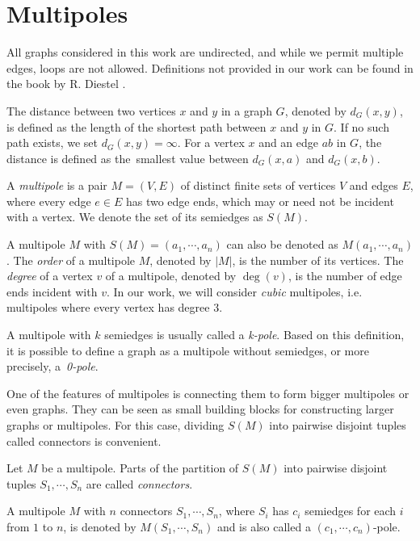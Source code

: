 \section{Multipoles}\label{sec:multipoles}

All graphs considered in this work are undirected, and while we permit multiple edges, loops are not allowed. Definitions not provided in our work can be found in the book  by R. Diestel \cite{Diestel2010}.

The distance between two vertices $x$ and $y$ in a graph $G$, denoted by $d_G(x,y)$, is defined as the length of the shortest path between $x$ and $y$ in $G$. If no such path exists, we set $d_G(x,y)=\infty$. For a vertex $x$ and an edge $ab$ in $G$, the distance is defined as the~smallest value between $d_G(x,a)$ and $d_G(x,b)$.

A \textit{multipole} is a pair $M=(V,E)$ of distinct finite sets of vertices $V$ and edges $E$, where every edge $e\in E$ has two edge ends, which may or need not be incident with a vertex. We denote the set of its semiedges as $S(M)$.

A multipole $M$ with $S(M) = (a_1, \cdots, a_n)$ can also be denoted as $M(a_1,\cdots,a_n)$. The \textit{order} of a multipole $M$, denoted by $|M|$, is the number of its vertices. The \textit{degree} of a vertex $v$ of a multipole, denoted by $\deg(v)$, is the number of edge ends incident with $v$. In our work, we will consider \textit{cubic} multipoles, i.e. multipoles where every vertex has degree $3$. 

A multipole with $k$ semiedges is usually called a \textit{k-pole}. Based on this definition, it is possible to define a graph as a multipole without semiedges, or more precisely, a~\textit{0-pole}.

One of the features of multipoles is connecting them to form bigger multipoles or even graphs. They can be seen as small building blocks for constructing larger graphs or multipoles. For this case, dividing $S(M)$ into pairwise disjoint tuples called connectors is convenient.

\begin{definition}
	Let $M$ be a multipole. Parts of the partition of $S(M)$ into pairwise disjoint tuples $S_1,\cdots, S_n$ are called \textit{connectors}.
\end{definition}

A multipole $M$ with $n$ connectors $S_1,\cdots,S_n$, where $S_i$ has $c_i$ semiedges for each $i$ from $1$ to $n$, is denoted by $M(S_1,\cdots,S_n)$ and is also called a $(c_1,\cdots,c_n)$-pole.

